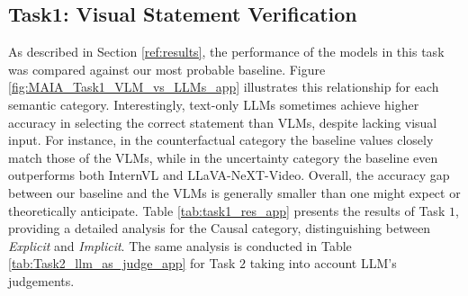 \subsection{Task1: Visual Statement Verification}
\label{sec:app_task1}

As described in Section \ref{ref:results}, the performance of the models in this task was compared against our most probable baseline. Figure \ref{fig:MAIA_Task1_VLM_vs_LLMs_app} illustrates this relationship for each semantic category. Interestingly, text-only LLMs sometimes achieve higher accuracy in selecting the correct statement than VLMs, despite lacking visual input. For instance, in the counterfactual category the baseline values closely match those of the VLMs, while in the uncertainty category the baseline even outperforms both InternVL and LLaVA-NeXT-Video. Overall, the accuracy gap between our baseline and the VLMs is generally smaller than one might expect or theoretically anticipate. Table \ref{tab:task1_res_app} presents the results of Task $1$, providing a detailed analysis for the Causal category, distinguishing between \textit{Explicit} and \textit{Implicit}. The same analysis is conducted in Table \ref{tab:Task2_llm_as_judge_app} for Task $2$ taking into account LLM's judgements.

